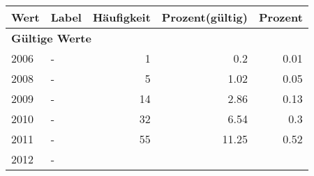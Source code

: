      \begin{longtable}{lXrrr}
     \toprule
     \textbf{Wert} & \textbf{Label} & \textbf{Häufigkeit} & \textbf{Prozent(gültig)} & \textbf{Prozent} \\
     \endhead
     \midrule
     \multicolumn{5}{l}{\textbf{Gültige Werte}}\\

     2006 &
     \multicolumn{1}{X}{ -  } &


       \num{1} &
       \num[round-mode=places,round-precision=2]{0.2} &
         \num[round-mode=places,round-precision=2]{0.01} \\

     2008 &
     \multicolumn{1}{X}{ -  } &


       \num{5} &
       \num[round-mode=places,round-precision=2]{1.02} &
         \num[round-mode=places,round-precision=2]{0.05} \\

     2009 &
     \multicolumn{1}{X}{ -  } &


       \num{14} &
       \num[round-mode=places,round-precision=2]{2.86} &
         \num[round-mode=places,round-precision=2]{0.13} \\

     2010 &
     \multicolumn{1}{X}{ -  } &


       \num{32} &
       \num[round-mode=places,round-precision=2]{6.54} &
         \num[round-mode=places,round-precision=2]{0.3} \\

     2011 &
     \multicolumn{1}{X}{ -  } &


       \num{55} &
       \num[round-mode=places,round-precision=2]{11.25} &
         \num[round-mode=places,round-precision=2]{0.52} \\

     2012 &
     \multicolumn{1}{X}{ -  } &



\end{longtable}

